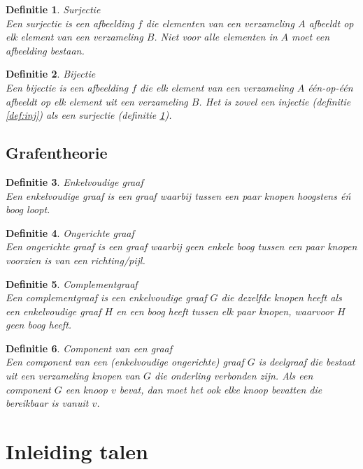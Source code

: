 \documentclass[a4paper]{article}
\newtheorem{tdefinitie}{Definitie}[section]
\newenvironment{definitie}[1]%
  {\begin{mdframed}[backgroundcolor=silver,
    topline=false,
    rightline=false,
    leftline=false,
    bottomline=false]\begin{tdefinitie}#1\\\normalfont}%
  {\end{tdefinitie}\end{mdframed}}
\begin{document}
\begin{definitie}{Surjectie}
  \label{def:surj}
  Een surjectie is een afbeelding $f$ die elementen van een verzameling $A$ afbeeldt op elk element van een verzameling $B$. Niet voor alle elementen in $A$ moet een afbeelding bestaan.
\end{definitie}

\begin{definitie}{Bijectie}
  Een bijectie is een afbeelding $f$ die elk element van een verzameling $A$ \'e\'en-op-\'e\'en afbeeldt op elk element uit een verzameling $B$. Het is zowel een injectie (definitie \ref{def:inj}) als een surjectie (definitie \ref{def:surj}).
\end{definitie}

\subsection{Grafentheorie}

\begin{definitie}{Enkelvoudige graaf}
  Een enkelvoudige graaf is een graaf waarbij tussen een paar knopen hoogstens \'e\'n boog loopt.
\end{definitie}

\begin{definitie}{Ongerichte graaf}
  Een ongerichte graaf is een graaf waarbij geen enkele boog tussen een paar knopen voorzien is van een richting/pijl.
\end{definitie}

\begin{definitie}{Complementgraaf}
  \label{def:graphcomplement}
  Een complementgraaf is een enkelvoudige graaf $G$ die dezelfde knopen heeft als een enkelvoudige graaf $H$ en een boog heeft tussen elk paar knopen, waarvoor $H$ geen boog heeft.
\end{definitie}

\begin{definitie}{Component van een graaf}
  \label{def:graphcomponent}
  Een component van een (enkelvoudige ongerichte) graaf $G$ is deelgraaf die bestaat uit een verzameling knopen van $G$ die onderling verbonden zijn. Als een component $G$ een knoop $v$ bevat, dan moet het ook elke knoop bevatten die bereikbaar is vanuit $v$.
\end{definitie} 
  
\newpage\section{Inleiding talen}
\end{document}
